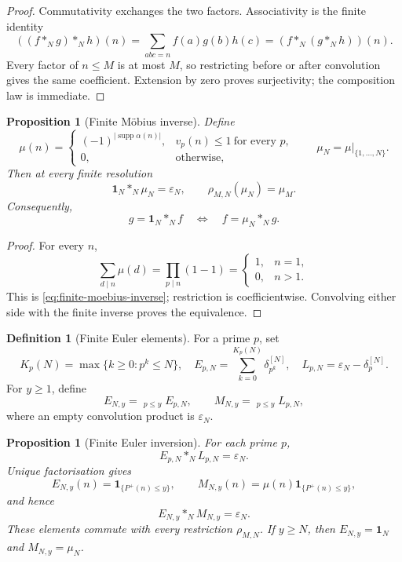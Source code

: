 \documentclass[11pt,a4paper]{article}
\newtheorem{proposition}[theorem]{Proposition}
\theoremstyle{definition}
\newtheorem{definition}[theorem]{Definition}
\begin{document}
\begin{proof}
Commutativity exchanges the two factors. Associativity is the finite identity
\[
  ((f*_Ng)*_Nh)(n)
  =\sum_{abc=n}f(a)g(b)h(c)
  =(f*_N(g*_Nh))(n).
\]
Every factor of $n\leq M$ is at most $M$, so restricting before or after
convolution gives the same coefficient. Extension by zero proves surjectivity;
the composition law is immediate.
\end{proof}

\begin{proposition}[Finite Möbius inverse]
\label{prop:finite-moebius-inverse}
Define
\[
  \mu(n)=
  \begin{cases}
    (-1)^{|\operatorname{supp}\alpha(n)|},
      &v_p(n)\leq1\ \text{for every }p,\\
    0,&\text{otherwise},
  \end{cases}
  \qquad
  \mu_N=\mu|_{\{1,\ldots,N\}}.
\]
Then at every finite resolution
\begin{equation}
\label{eq:finite-moebius-inverse}
  \mathbf1_N*_N\mu_N=\varepsilon_N,
  \qquad
  \rho_{M,N}(\mu_N)=\mu_M.
\end{equation}
Consequently,
\[
  g=\mathbf1_N*_Nf
  \quad\Longleftrightarrow\quad
  f=\mu_N*_Ng.
\]
\end{proposition}

\begin{proof}
For every $n$,
\[
  \sum_{d\mid n}\mu(d)
  =\prod_{p\mid n}(1-1)
  =
  \begin{cases}
    1,&n=1,\\
    0,&n>1.
  \end{cases}
\]
This is \cref{eq:finite-moebius-inverse}; restriction is coefficientwise.
Convolving either side with the finite inverse proves the equivalence.
\end{proof}

\begin{definition}[Finite Euler elements]
\label{def:finite-euler-elements}
For a prime $p$, set
\[
  K_p(N)=\max\{k\geq0:p^k\leq N\},
  \quad
  E_{p,N}=\sum_{k=0}^{K_p(N)}\delta_{p^k}^{[N]},
  \quad
  L_{p,N}=\varepsilon_N-\delta_p^{[N]}.
\]
For $y\geq1$, define
\[
  E_{N,y}=\mathop{*_N}_{p\leq y}E_{p,N},
  \qquad
  M_{N,y}=\mathop{*_N}_{p\leq y}L_{p,N},
\]
where an empty convolution product is $\varepsilon_N$.
\end{definition}

\begin{proposition}[Finite Euler inversion]
\label{prop:finite-euler-inversion}
For each prime $p$,
\[
  E_{p,N}*_NL_{p,N}=\varepsilon_N.
\]
Unique factorisation gives
\[
  E_{N,y}(n)=\mathbf1_{\{P^+(n)\leq y\}},
  \qquad
  M_{N,y}(n)=\mu(n)\mathbf1_{\{P^+(n)\leq y\}},
\]
and hence
\begin{equation}
\label{eq:finite-euler-inversion}
  E_{N,y}*_NM_{N,y}=\varepsilon_N.
\end{equation}
These elements commute with every restriction $\rho_{M,N}$. If $y\geq N$,
then $E_{N,y}=\mathbf1_N$ and $M_{N,y}=\mu_N$.
\end{proposition}
\end{document}
